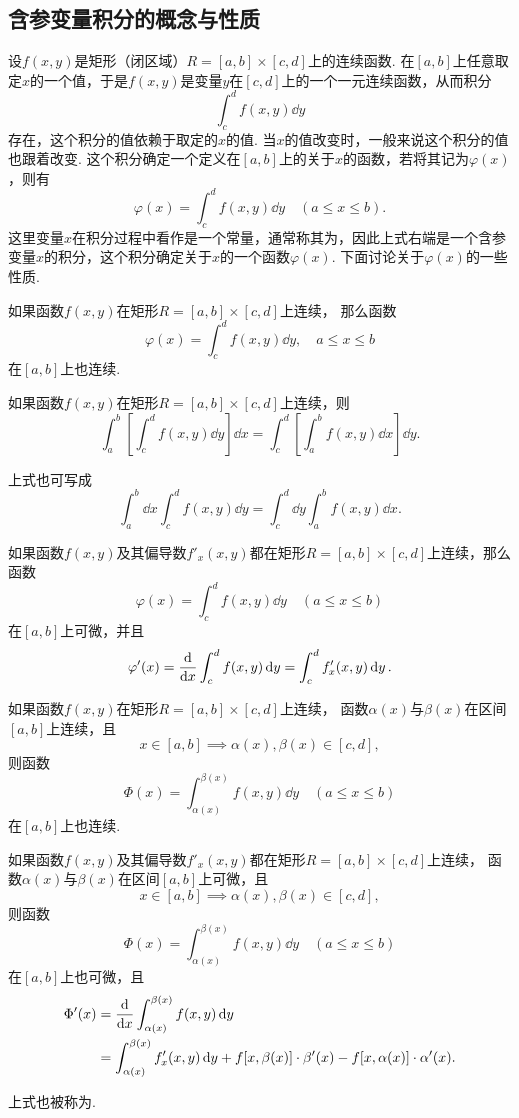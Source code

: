 \subsection{含参变量积分的概念与性质}
设\(f(x,y)\)是矩形（闭区域）\(R = [a,b]\times[c,d]\)上的连续函数.
在\([a,b]\)上任意取定\(x\)的一个值，于是\(f(x,y)\)是变量\(y\)在\([c,d]\)上的一个一元连续函数，从而积分\[
\int_c^d f(x,y) \dd{y}
\]存在，这个积分的值依赖于取定的\(x\)的值.
当\(x\)的值改变时，一般来说这个积分的值也跟着改变.
这个积分确定一个定义在\([a,b]\)上的关于\(x\)的函数，若将其记为\(\varphi(x)\)，则有\[
\varphi(x) = \int_c^d f(x,y) \dd{y}
\quad(a \leq x \leq b).
\]这里变量\(x\)在积分过程中看作是一个常量，通常称其为，因此上式右端是一个含参变量\(x\)的积分，这个积分确定关于\(x\)的一个函数\(\varphi(x)\).
下面讨论关于\(\varphi(x)\)的一些性质.

\begin{theorem}
如果函数\(f(x,y)\)在矩形\(R=[a,b]\times[c,d]\)上连续，
那么函数\[
\varphi(x) = \int_c^d{f(x,y)\dd{y}}, \quad a \leq x \leq b
\]在\([a,b]\)上也连续.
\end{theorem}

\begin{theorem}
如果函数\(f(x,y)\)在矩形\(R=[a,b]\times[c,d]\)上连续，则\[
\int_a^b\left[\int_c^d f(x,y) \dd{y}\right] \dd{x}
=\int_c^d\left[\int_a^b f(x,y) \dd{x}\right] \dd{y}.
\]
\end{theorem}
上式也可写成\[
\int_a^b \dd{x} \int_c^d f(x,y) \dd{y}
=\int_c^d \dd{y} \int_a^b f(x,y) \dd{x}.
\]

\begin{theorem}
如果函数\(f(x,y)\)及其偏导数\(f'_x(x,y)\)都在矩形\(R=[a,b]\times[c,d]\)上连续，那么函数\[
\varphi(x) = \int_c^d f(x,y) \dd{y}
\quad(a \leq x \leq b)
\]在\([a,b]\)上可微，并且\[
\varphi'(x) = \dv{x} \int_c^d f(x,y) \dd{y}
= \int_c^d f'_x(x,y) \dd{y}.
\]
\end{theorem}

\begin{theorem}
如果函数\(f(x,y)\)在矩形\(R=[a,b]\times[c,d]\)上连续，
函数\(\alpha(x)\)与\(\beta(x)\)在区间\([a,b]\)上连续，且\[
x \in [a,b] \implies \alpha(x),\beta(x) \in [c,d],
\]则函数\[
\Phi(x) = \int_{\alpha(x)}^{\beta(x)} f(x,y)\dd{y}
\quad(a \leq x \leq b)
\]在\([a,b]\)上也连续.
\end{theorem}

\begin{theorem}
如果函数\(f(x,y)\)及其偏导数\(f'_x(x,y)\)都在矩形\(R=[a,b]\times[c,d]\)上连续，
函数\(\alpha(x)\)与\(\beta(x)\)在区间\([a,b]\)上可微，且\[
x \in [a,b] \implies \alpha(x),\beta(x) \in [c,d],
\]则函数\[
\Phi(x) = \int_{\alpha(x)}^{\beta(x)} f(x,y)\dd{y}
\quad(a \leq x \leq b)
\]在\([a,b]\)上也可微，且\begin{align*}
\Phi'(x) &= \dv{x} \int_{\alpha(x)}^{\beta(x)} f(x,y) \dd{y} \\
&= \int_{\alpha(x)}^{\beta(x)} f'_x(x,y) \dd{y}
	+ f[x,\beta(x)] \cdot \beta'(x)
	- f[x,\alpha(x)] \cdot \alpha'(x).
\end{align*}
\end{theorem}
上式也被称为.

